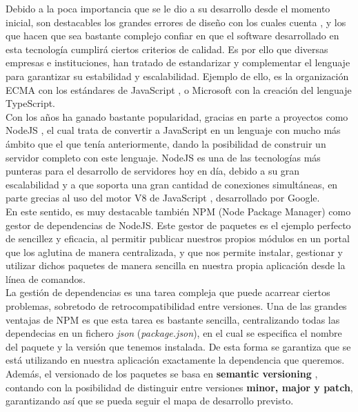 Debido a la poca importancia que se le dio a su desarrollo desde el momento inicial, son destacables los grandes errores de diseño con los cuales cuenta \cite{KennethEng2019}, y los que hacen que sea bastante complejo confiar en que el software desarrollado en esta tecnología cumplirá ciertos criterios de calidad. Es por ello que diversas empresas e instituciones, han tratado de estandarizar y complementar el lenguaje para garantizar su estabilidad y escalabilidad. Ejemplo de ello, es la organización ECMA con los estándares de JavaScript \cite{ecmascript}, o Microsoft con la creación del lenguaje TypeScript.\\

Con los años ha ganado bastante popularidad, gracias en parte a proyectos como NodeJS \cite{node}, el cual trata de convertir a JavaScript en un lenguaje con mucho más ámbito que el que tenía anteriormente, dando la posibilidad de construir un servidor completo con este lenguaje. NodeJS es una de las tecnologías más punteras para el desarrollo de servidores hoy en día, debido a su gran escalabilidad y a que soporta una gran cantidad de conexiones simultáneas, en parte grecias al uso del motor V8 de JavaScript \cite{motor-v8}, desarrollado por Google. \\

En este sentido, es muy destacable también NPM (Node Package Manager) \cite{npm} como gestor de dependencias de NodeJS. Este gestor de paquetes es el ejemplo perfecto de sencillez y eficacia, al permitir publicar nuestros propios módulos en un portal que los aglutina de manera centralizada, y que nos permite instalar, gestionar y utilizar dichos paquetes de manera sencilla en nuestra propia aplicación desde la línea de comandos. \\

La gestión de dependencias es una tarea compleja que puede acarrear ciertos problemas, sobretodo de retrocompatibilidad entre versiones. Una de las grandes ventajas de NPM es que esta tarea es bastante sencilla, centralizando todas las dependecias en un fichero \textit{json} (\textit{package.json}), en el cual se especifica el nombre del paquete y la versión que tenemos instalada. De esta forma se garantiza que se está utilizando en nuestra aplicación exactamente la dependencia que queremos. \\

Además, el versionado de los paquetes se basa en \textbf{semantic versioning} \cite{semver}, contando con la posibilidad de distinguir entre versiones \textbf{minor, major y patch}, garantizando así que se pueda seguir el mapa de desarrollo previsto. \\

